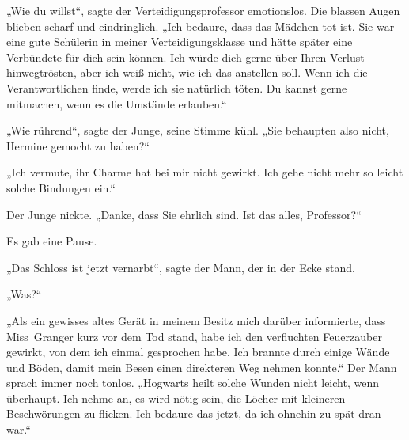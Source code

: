 „Wie du willst“, sagte der Verteidigungsprofessor emotionslos. Die blassen Augen blieben scharf und eindringlich.
„Ich bedaure, dass das Mädchen tot ist. Sie war eine gute Schülerin in meiner Verteidigungsklasse und hätte später eine Verbündete für dich sein können. Ich würde dich gerne über Ihren Verlust hinwegtrösten, aber ich weiß nicht, wie ich das anstellen soll. Wenn ich die Verantwortlichen finde, werde ich sie natürlich töten. Du kannst gerne mitmachen, wenn es die Umstände erlauben.“

„Wie rührend“, sagte der Junge, seine Stimme kühl.
„Sie behaupten also nicht, Hermine gemocht zu haben?“

„Ich vermute, ihr Charme hat bei mir nicht gewirkt. Ich gehe nicht mehr so leicht solche Bindungen ein.“

Der Junge nickte.
„Danke, dass Sie ehrlich sind. Ist das alles, Professor?“

Es gab eine Pause.

„Das Schloss ist jetzt vernarbt“, sagte der Mann, der in der Ecke stand.

„Was?“

„Als ein gewisses altes Gerät in meinem Besitz mich darüber informierte, dass Miss~Granger kurz vor dem Tod stand, habe ich den verfluchten Feuerzauber gewirkt, von dem ich einmal gesprochen habe. Ich brannte durch einige Wände und Böden, damit mein Besen einen direkteren Weg nehmen konnte.“
Der Mann sprach immer noch tonlos.
„Hogwarts heilt solche Wunden nicht leicht, wenn überhaupt. Ich nehme an, es wird nötig sein, die Löcher mit kleineren Beschwörungen zu flicken. Ich bedaure das jetzt, da ich ohnehin zu spät dran war.“

